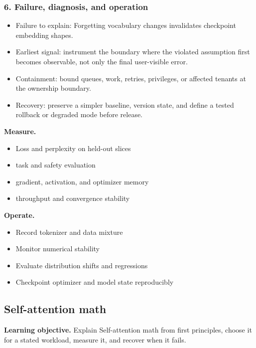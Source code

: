 \subsubsection*{6. Failure, diagnosis, and operation}
\begin{itemize}
\item Failure to explain: Forgetting vocabulary changes invalidates checkpoint embedding shapes.
\item Earliest signal: instrument the boundary where the violated assumption first becomes observable, not only the final user-visible error.
\item Containment: bound queues, work, retries, privileges, or affected tenants at the ownership boundary.
\item Recovery: preserve a simpler baseline, version state, and define a tested rollback or degraded mode before release.
\end{itemize}
\textbf{Measure.}\begin{itemize}
\item Loss and perplexity on held-out slices
\item task and safety evaluation
\item gradient, activation, and optimizer memory
\item throughput and convergence stability
\end{itemize}
\textbf{Operate.}\begin{itemize}
\item Record tokenizer and data mixture
\item Monitor numerical stability
\item Evaluate distribution shifts and regressions
\item Checkpoint optimizer and model state reproducibly
\end{itemize}
\subsection{Self-attention math}
\textbf{Learning objective.} Explain Self-attention math from first principles, choose it for a stated workload, measure it, and recover when it fails.

